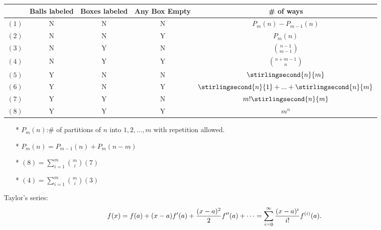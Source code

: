       \begin{tabular}{|c|c|c|c|c|}
        \hline
         & Balls labeled & Boxes labeled & Any Box Empty & \# of ways \\ \hline
        $(1)$ & N & N & N & $P_m(n)-P_{m-1}(n)$ \\ \hline
        $(2)$ & N & N & Y & $P_m(n)$ \\ \hline
        $(3)$ & N & Y & N & $\binom{n-1}{m-1}$ \\ \hline
        $(4)$ & N & Y & Y & $\binom{n+m-1}{n}$ \\ \hline
        $(5)$ & Y & N & N & $\stirlingsecond{n}{m}$ \\ \hline
        $(6)$ & Y & N & Y & $\stirlingsecond{n}{1}+...+\stirlingsecond{n}{m}$ \\ \hline
        $(7)$ & Y & Y & N & $m!\stirlingsecond{n}{m}$ \\ \hline
        $(8)$ & Y & Y & Y & $m^n$ \\ \hline
      \end{tabular}
    \begin{enumerate}
    \item[*] $P_m(n)$:\# of partitions of $n$ into $1,2,...,m$ with repetition allowed.
    \item[*] $P_m(n)=P_{m-1}(n)+P_{m}(n-m)$
    \item[*] $(8)=\sum^m_{i=1}\binom{m}{i}(7)$
    \item[*] $(4)=\sum^m_{i=1}\binom{m}{i}(3)$
    \end{enumerate}
    Taylor's series:
$$
f(x) = f(a) + (x-a)f'(a) + {(x-a)^2 \over 2} f''(a) + \cdots = \sum_{i=0}^\infty {(x-a)^i \over i!} f^{(i)}(a).
$$



